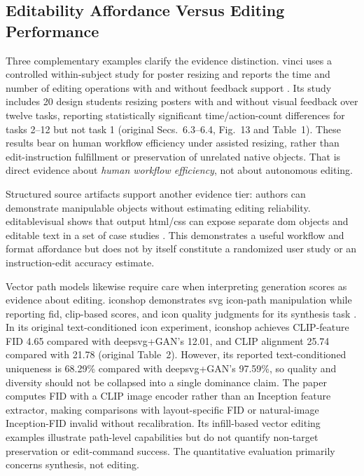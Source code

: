 \subsection{Editability Affordance Versus Editing Performance}
Three complementary examples clarify the evidence distinction.
\ac{vinci} uses a controlled within-subject study for poster resizing and reports the time and number of editing operations with and without feedback support \citep{vinci2021}.
Its study includes 20 design students resizing posters with and without visual feedback over twelve tasks, reporting statistically significant time/action-count differences for tasks 2--12 but not task 1 (original Secs.~6.3--6.4, Fig.~13 and Table~1).
These results bear on human workflow efficiency under assisted resizing, rather than edit-instruction fulfillment or preservation of unrelated native objects.
That is direct evidence about \emph{human workflow efficiency}, not about autonomous editing.

Structured source artifacts support another evidence tier: authors can demonstrate manipulable objects without estimating editing reliability.
\ac{editablevisual} shows that output \ac{html}/\ac{css} can expose separate \ac{dom} objects and editable text in a set of case studies \citep{editablevisual2026}.
This demonstrates a useful workflow and format affordance but does not by itself constitute a randomized user study or an instruction-edit accuracy estimate.

Vector path models likewise require care when interpreting generation scores as evidence about editing.
\ac{iconshop} demonstrates \ac{svg} icon-path manipulation while reporting \ac{fid}, \ac{clip}-based scores, and icon quality judgments for its synthesis task \citep{iconshop2023}.
In its original text-conditioned icon experiment, \ac{iconshop} achieves CLIP-feature FID 4.65 compared with \ac{deepsvg}+GAN's 12.01, and CLIP alignment 25.74 compared with 21.78 (original Table~2).
However, its reported text-conditioned uniqueness is 68.29\% compared with \ac{deepsvg}+GAN's 97.59\%, so quality and diversity should not be collapsed into a single dominance claim.
The paper computes FID with a CLIP image encoder rather than an Inception feature extractor, making comparisons with layout-specific FID or natural-image Inception-FID invalid without recalibration.
Its infill-based vector editing examples illustrate path-level capabilities but do not quantify non-target preservation or edit-command success.
The quantitative evaluation primarily concerns synthesis, not editing.

